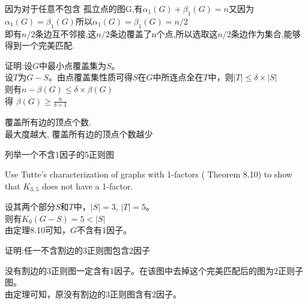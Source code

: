 \documentclass[a4paper, justified]{tufte-handout}
\begin{document}
\begin{solution}
  因为对于任意不包含 孤立点的图G,有$\alpha_1(G)+\beta_1(G)=n$又因为$\alpha_1(G)=\beta_1(G)$所以$\alpha_1(G)=\beta_1(G) = n/2$\\
  即有$n/2$条边互不邻接,这$n/2$条边覆盖了n个点,所以选取这$n/2$条边作为集合,能够得到一个完美匹配.
\end{solution}

\begin{problem}[CZ 8.16]
证明:设$G$中最小点覆盖集为$S$。\\
设$T$为$G-S$。由点覆盖集性质可得$S$在$G$中所连点全在$T$中，则$|T|\leq \delta \times |S|$\\
则有$n-\beta(G)\leq \delta \times \beta(G)$\\
得 $\beta(G)\geq \frac{n}{\delta + 1}$
\end{problem}

\begin{solution}
  覆盖所有边的顶点个数.\\
  最大度越大, 覆盖所有边的顶点个数越少
\end{solution}

\begin{problem}[CZ 8.18]
列举一个不含1因子的5正则图
\end{problem}

\begin{solution}

\end{solution}

\begin{problem}[CZ 8.21]
Use Tutte’s characterization of graphs with 1-factors ( Theorem 8.10) to show that $K_{3,5}$ does not have a 1-factor.
\end{problem}

\begin{solution}
  设其两个部分$S$和$T$中，$|S|= 3$, $|T|=5$。\\
  则有$K_0(G-S)=5<|S|$\\
  由定理8.10可知，$G$不含有1因子。
\end{solution}

\begin{problem}[CZ 8.24]
证明:任一不含割边的3正则图包含2因子
\end{problem}

\begin{solution}
  没有割边的3正则图一定含有1因子。在该图中去掉这个完美匹配后的图为$2$正则子图。\\
  由定理可知，原没有割边的3正则图含有2因子。
\end{solution}
\end{document}
